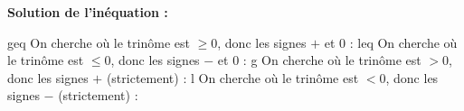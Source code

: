 {\begin{MultiColonnes}{2}

    \vspace{2mm}

    \textbf{Solution de l'inéquation :}

    \def\tempgeq{geq}\def\templeq{leq}\def\tempg{g}\def\templ{l}%
    \ifx\typeineg\tempgeq
        On cherche où le trinôme est $\geq 0$, donc les signes $+$ et $0$ :
    \fi
    \ifx\typeineg\templeq
        On cherche où le trinôme est $\leq 0$, donc les signes $-$ et $0$ :
    \fi
    \ifx\typeineg\tempg
        On cherche où le trinôme est $> 0$, donc les signes $+$ (strictement) :
    \fi
    \ifx\typeineg\templ
        On cherche où le trinôme est $< 0$, donc les signes $-$ (strictement) :
    \fi


\end{MultiColonnes}}
